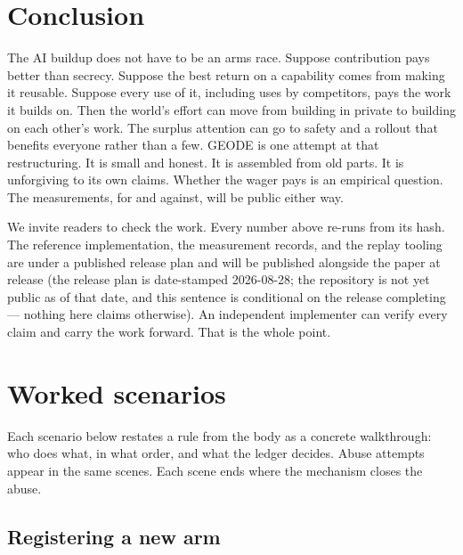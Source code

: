 \documentclass[11pt]{article}
\begin{document}
\section{Conclusion}

The AI buildup does not have to be an arms race. Suppose
contribution pays better than secrecy. Suppose the best return on
a capability comes from making it reusable. Suppose every use of
it, including uses by competitors, pays the work it builds on.
Then the world's effort can move from building in private to
building on each other's work. The surplus attention can go to
safety and a rollout that benefits everyone rather than a few.
GEODE is one attempt at that restructuring. It is small and
honest. It is assembled from old parts. It is unforgiving to its
own claims. Whether the wager pays is an empirical question. The
measurements, for and against, will be public either way.

We invite readers to check the work. Every number above re-runs
from its hash. The reference implementation, the measurement
records, and the replay tooling are under a published release
plan and will be published alongside the paper at release (the
release plan is date-stamped 2026-08-28; the repository is not
yet public as of that date, and this sentence is conditional on
the release completing — nothing here claims otherwise). An
independent implementer can verify every claim and carry the work
forward. That is the whole point.

\appendix
\section{Worked scenarios}\label{app:scenarios}

Each scenario below restates a rule from the body as a concrete
walkthrough: who does what, in what order, and what the ledger
decides. Abuse attempts appear in the same scenes. Each scene
ends where the mechanism closes the abuse.

\subsection{Registering a new arm}
\end{document}
